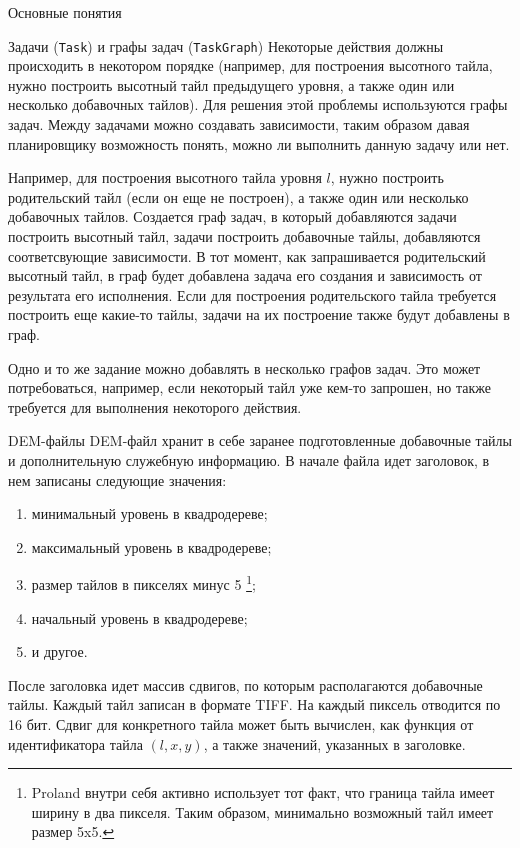 \documentclass[12pt]{article}
\newcommand{\englishterm}[1]{\textenglish{\texttt{#1}}}
\begin{document}
\begin{section}{Основные понятия}
\begin{subsection}{Задачи (\englishterm{Task}) и графы задач (\englishterm{TaskGraph})}
Некоторые действия должны происходить в некотором порядке (например, для построения высотного тайла, нужно построить высотный тайл предыдущего уровня, а также один или несколько добавочных тайлов). Для решения этой проблемы используются графы задач.
Между задачами можно создавать зависимости, таким образом давая планировщику возможность понять, можно ли выполнить данную задачу или нет.

Например, для построения высотного тайла уровня $l$, нужно построить родительский тайл (если он еще не построен), а также один или несколько добавочных тайлов. Создается граф задач, в который добавляются задачи построить высотный тайл, задачи построить добавочные тайлы, добавляются соответсвующие зависимости.
В тот момент, как запрашивается родительский высотный тайл, в граф будет добавлена задача его создания и зависимость от результата его исполнения. Если для построения родительского тайла требуется построить еще какие-то тайлы, задачи на их построение также будут добавлены в граф.

Одно и то же задание можно добавлять в несколько графов задач. Это может потребоваться, например, если некоторый тайл уже кем-то запрошен, но также требуется для выполнения некоторого действия.
\end{subsection}

\begin{subsection}{DEM-файлы}
DEM-файл хранит в себе заранее подготовленные добавочные тайлы и дополнительную служебную информацию.
В начале файла идет заголовок, в нем записаны следующие значения:
\begin{enumerate}
    \item минимальный уровень в квадродереве;
    \item максимальный уровень в квадродереве;
    \item размер тайлов в пикселях минус 5 \footnote{Proland внутри себя активно использует тот факт, что граница тайла имеет ширину в два пикселя. Таким образом, минимально возможный тайл имеет размер 5x5.};
    \item начальный уровень в квадродереве;
    \item и другое.
\end{enumerate}

После заголовка идет массив сдвигов, по которым располагаются добавочные тайлы. Каждый тайл записан в формате TIFF. На каждый пиксель отводится по 16 бит.
Сдвиг для конкретного тайла может быть вычислен, как функция от идентификатора тайла $(l, x, y)$, а также значений, указанных в заголовке.


\end{subsection}
\end{section}
\end{document}
